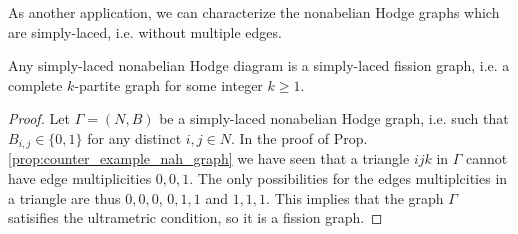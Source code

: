 \documentclass[11pt,a4paper]{amsart}
\numberwithin{equation}{section}
\begin{document}
As another application, we can characterize the nonabelian Hodge graphs which are simply-laced, i.e. without multiple edges. 

\begin{proposition}
\label{prop:no_new_simply_laced_graphs}
Any simply-laced nonabelian Hodge diagram is a simply-laced fission graph, i.e. a complete $k$-partite graph for some integer $k\geq 1$. 
\end{proposition}

\begin{proof}
Let $\Gamma=(N,B)$ be a simply-laced nonabelian Hodge graph, i.e. such that $B_{i,j}\in \{0,1\}$ for any distinct $i,j\in N$. In the proof of Prop. \ref{prop:counter_example_nah_graph} we have seen that a triangle $ijk$ in $\Gamma$ cannot have edge multiplicities $0,0,1$. The only possibilities for the edges multiplcities in a triangle are thus $0,0,0$, $0,1,1$ and $1,1,1$. This implies that the graph $\Gamma$ satisifies the ultrametric condition, so it is a fission graph.
\end{proof}
\end{document}
